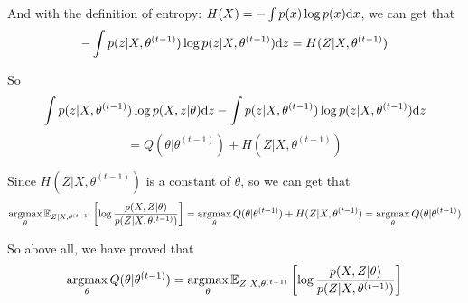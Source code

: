 And with the definition of entropy: $H(X)=-\int p(x)\log p(x)\mathrm{d}x$, we can get that
$$-\int p(z|X,\theta^{(t-1)})\log p(z|X,\theta^{(t-1)})\mathrm{d}z=H(Z|X,\theta^{(t-1)})$$

So
$$\int p(z|X,\theta^{(t-1)})\log p(X,z|\theta)\mathrm{d}z-\int p(z|X,\theta^{(t-1)})\log p(z|X,\theta^{(t-1)})\mathrm{d}z$$
$$=Q(\theta|\theta^{(t-1)})+H(Z|X,\theta^{(t-1)})$$

Since $H(Z|X,\theta^{(t-1)})$ is a constant of $\theta$, so we can get that
$$\mathop{\rm argmax}\limits_{\theta} \mathbb{E}_{Z|X,\theta^{(t-1)}}\left[\log \dfrac{p(X,Z|\theta)}{p(Z|X,\theta^{(t-1)})}\right] = \mathop{\rm argmax}\limits_{\theta} Q(\theta|\theta^{(t-1)}) + H(Z|X,\theta^{(t-1)}) = \mathop{\rm argmax}\limits_{\theta} Q(\theta|\theta^{(t-1)})$$

So above all, we have proved that
$$\mathop{\rm argmax}\limits_{\theta} Q(\theta|\theta^{(t-1)}) = \mathop{\rm argmax}\limits_{\theta} \mathbb{E}_{Z|X,\theta^{(t-1)}}\left[\log \dfrac{p(X,Z|\theta)}{p(Z|X,\theta^{(t-1)})}\right]$$

\newpage